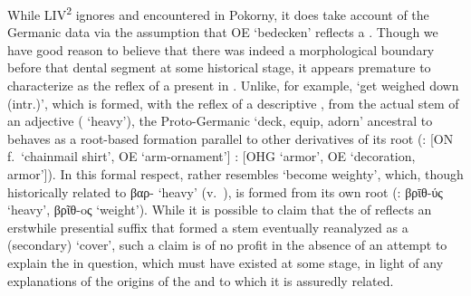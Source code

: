 \documentclass[output=paper,colorlinks,citecolor=brown]{langscibook}
\begin{document}
While LIV\textsuperscript{2} ignores  and  encountered in Pokorny, it does take account of the Germanic data via the assumption that OE  ‘bedecken’ reflects a  . Though we have good reason to believe that there was indeed a morphological boundary before that dental segment at some historical stage, it appears premature to characterize  as the reflex of a present in . Unlike, for example,  ‘get weighed down (intr.)’, which is formed, with the reflex of a descriptive , from the actual stem of an adjective ( ‘heavy’), the Proto-Germanic  ‘deck, equip, adorn’ ancestral to  behaves as a root-based formation parallel to other derivatives of its root (:  [ON  f.\ ‘chainmail shirt’, OE  ‘arm-ornament’] :  [OHG  ‘armor’, OE  ‘decoration, armor’]). In this formal respect,  rather resembles  ‘become weighty’, which, though historically related to βαρ-  ‘heavy’ (v.\ \citealt[94--95]{Rasmussen1989}), is formed from its own root (: βρῑθ-ύς  ‘heavy’, βρῖθ-oς  ‘weight’). While it is possible to claim that the  of  reflects an erstwhile presential suffix that formed a stem eventually reanalyzed as a (secondary)  ‘cover’, such a claim is of no profit in the absence of an attempt to explain the  in question, which must have existed at some stage, in light of any explanations of the origins of the  and  to which it is assuredly related.
\end{document}

